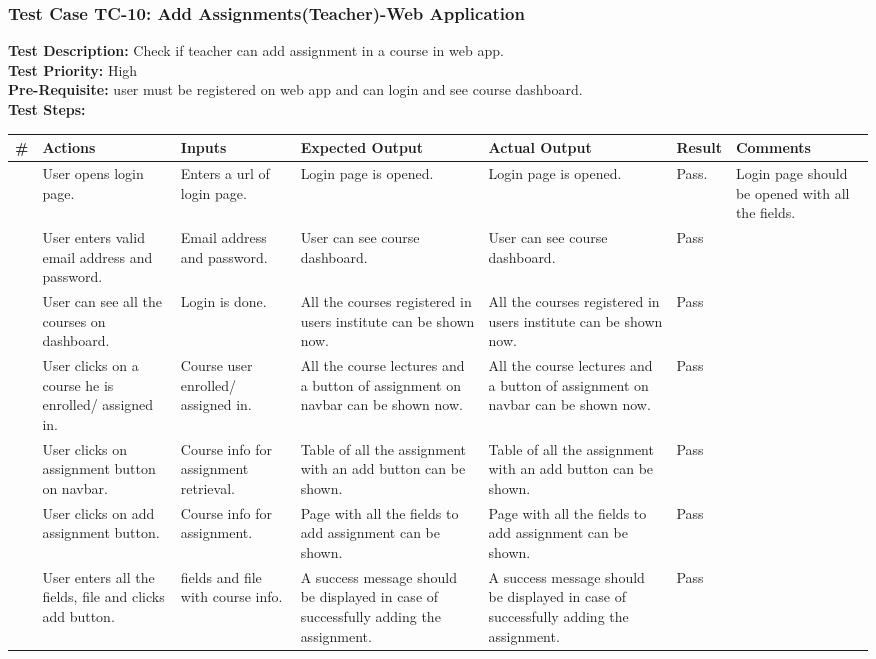 \documentclass[12pt]{article}
\begin{document}
\subsubsection{Test Case TC-10: Add Assignments(Teacher)-Web Application}
\textbf{Test Description: } Check if teacher can add assignment in a course in web app. \\
\textbf{Test Priority: } High \\
\textbf{Pre-Requisite: } user must be registered on web app and can login and see course dashboard. \\
\textbf{Test Steps: }
\newpage
\begin{longtable}{ |>{\raggedright\arraybackslash} p{0.7cm} | >{\raggedright\arraybackslash}p{2cm}|>{\raggedright\arraybackslash} p{2cm} |>{\raggedright\arraybackslash} p{2.5cm} |>{\raggedright\arraybackslash} p{2.5cm} |>{\raggedright\arraybackslash} p{1.3cm} |>{\raggedright\arraybackslash} p{2.5cm} | } 
\hline
\textbf{\#}
& \textbf{Actions} 
& \textbf{Inputs}
& \textbf{Expected Output} 
& \textbf{Actual Output} 
& \textbf{Result} 
& \textbf{Comments} 
\\ 
\hline
1
& User opens login page. 
& Enters a url of login page.
& Login page is opened.
& Login page is opened.
& Pass.
& Login page should be opened with all the fields.
\\ 
\hline
2 
& User enters valid email address and password.
& Email address and password.
& User can see course dashboard.
& User can see course dashboard. 
& Pass
&  
\\ 
\hline
3
& User can see all the courses on dashboard.
& Login is done.
& All the courses registered in users institute can be shown now.
& All the courses registered in users institute can be shown now. 
& Pass
&  
\\ 
\hline
4
& User clicks on a course he is enrolled/ assigned in.
& Course user enrolled/ assigned in.
& All the course lectures and a button of assignment on navbar can be shown now.
& All the course lectures and a button of assignment on navbar can be shown now. 
& Pass
&  
\\ 
\hline
5
& User clicks on assignment button on navbar.
& Course info for assignment retrieval.
& Table of all the assignment with an add button can be shown.
& Table of all the assignment with an add button can be shown. 
& Pass
&  
\\ 
\hline
6
& User clicks on add assignment button.
& Course info for assignment.
& Page with all the fields to add assignment can be shown.
& Page with all the fields to add assignment can be shown. 
& Pass
&  
\\ 
\hline
7
& User enters all the fields, file and clicks add button.
& fields and file with course info.
& A success message should be displayed in case of successfully adding the assignment.
& A success message should be displayed in case of successfully adding the assignment. 
& Pass
&  
\\ 
\hline
\end{longtable}
\end{document}
